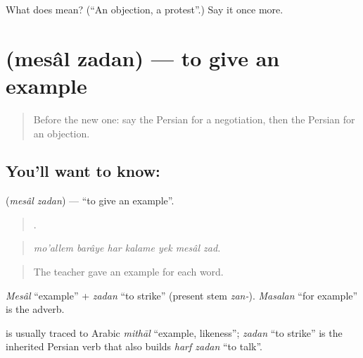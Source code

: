 \begin{tcolorbox}[breakable,colback=teal!4,colframe=teal!35!black,title={Before you move on}]
What does  mean? (\textquotedblleft{}An objection, a protest\textquotedblright{}.) Say it once more.
\end{tcolorbox}
\section[\texorpdfstring{\fa{مثال} \fa{زدن} (mesâl zadan)}{مثال زدن (mesâl zadan)}]{  (mesâl zadan) — to give an example}

\label{lesson:FA-C366-mesal-zadan}



\begin{quote}
Before the new one: say the Persian for a negotiation, then the Persian for an objection.
\end{quote}

\subsection*{You'll want to know:  }
\textbf{ } (\emph{mesâl zadan}) — \textquotedblleft{}to give an example\textquotedblright{}.

\begin{quote}
      .
\end{quote}

\begin{quote}
\emph{mo'allem barâye har kalame yek mesâl zad.}
\end{quote}

\begin{quote}
The teacher gave an example for each word.
\end{quote}

\emph{Mesâl} \textquotedblleft{}example\textquotedblright{} + \emph{zadan} \textquotedblleft{}to strike\textquotedblright{} (present stem \emph{zan-}). \emph{Masalan} \textquotedblleft{}for example\textquotedblright{} is the adverb.

\begin{cousinweb}
\textbf{} is usually traced to Arabic \emph{mithāl} \textquotedblleft{}example, likeness\textquotedblright{}; \emph{zadan} \textquotedblleft{}to strike\textquotedblright{} is the inherited Persian verb that also builds \emph{harf zadan} \textquotedblleft{}to talk\textquotedblright{}.
\end{cousinweb}

